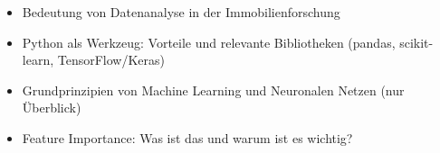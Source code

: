 \begin{itemize}
    \item Bedeutung von Datenanalyse in der Immobilienforschung
    \item Python als Werkzeug: Vorteile und relevante Bibliotheken (pandas, scikit-learn, TensorFlow/Keras)
    \item Grundprinzipien von Machine Learning und Neuronalen Netzen (nur Überblick)
    \item Feature Importance: Was ist das und warum ist es wichtig?
\end{itemize}